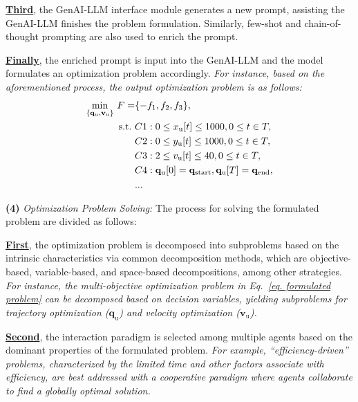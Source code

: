 \documentclass[twoside,11pt]{reviewresponse}
\theoremstyle{plain}
\theoremstyle{plain}
\begin{document}
\par \textbf{\ul{Third}}, the GenAI-LLM interface module generates a new prompt, assisting the GenAI-LLM finishes the problem formulation. Similarly, few-shot and chain-of-thought prompting are also used to enrich the prompt.

\par \textbf{\ul{Finally}}, the enriched prompt is input into the GenAI-LLM and the model formulates an optimization problem accordingly. \textit{For instance, based on the aforementioned process, the output optimization problem is as follows:}
\begin{subequations}
\label{eq. formulated problem}
\begin{align}
{\underset{\{\mathbf{q}_{\mathrm{u}}, \mathbf{v}_{\mathrm{u}}\}}{\text{min}}} \ F = &\{-f_1, f_2, f_3\}, \\
\text{s.t.}  \ & C1: 0 \le x_{\mathrm{u}}[t] \le 1000,  0 \le t\in T, \label{subeq. C1}\\
& C2: 0 \le y_{\mathrm{u}}[t] \le 1000,  0 \le t\in T, \label{subeq. C2}\\
& C3: 2 \le v_{\mathrm{u}}[t] \le 40,  0 \le t\in T, \label{subeq. C3}\\
& C4: \mathbf{q}_{\mathrm{u}}[0] = \mathbf{q}_{\mathrm{start}}, \mathbf{q}_{\mathrm{u}}[T] = \mathbf{q}_{\mathrm{end}}\label{subeq. C4},\\
& ...\notag
\end{align}
\end{subequations}

\par \textbf{(4)} \textit{Optimization Problem Solving:} The process for solving the formulated problem are divided as follows:

\par \textbf{\ul{First}}, the optimization problem is decomposed into subproblems based on the intrinsic characteristics via common decomposition methods, which are objective-based, variable-based, and space-based decompositions, among other strategies. \textit{For instance, the multi-objective optimization problem in Eq.~\eqref{eq. formulated problem} can be decomposed based on decision variables, yielding subproblems for trajectory optimization ($\mathbf{q}_{\mathrm{u}}$) and velocity optimization ($\mathbf{v}_{\mathrm{u}}$).}

\par \textbf{\ul{Second}}, the interaction paradigm is selected among multiple agents based on the dominant properties of the formulated problem. \textit{For example, \enquote{efficiency-driven} problems, characterized by the limited time and other factors associate with efficiency, are best addressed with a cooperative paradigm where agents collaborate to find a globally optimal solution.}
\end{document}
